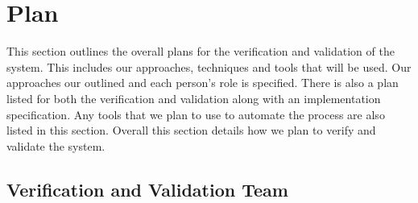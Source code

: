 \documentclass[12pt, titlepage]{article}
\begin{document}

\section{Plan}


This section outlines the overall plans for the verification and validation of the system.
This includes our approaches, techniques and tools that will be used.
Our approaches our outlined and each person's role is specified.
There is also a plan listed for both the verification and validation along with an implementation specification.
Any tools that we plan to use to automate the process are also listed in this section.
Overall this section details how we plan to verify and validate the system.

\subsection{Verification and Validation Team}

\end{document}
